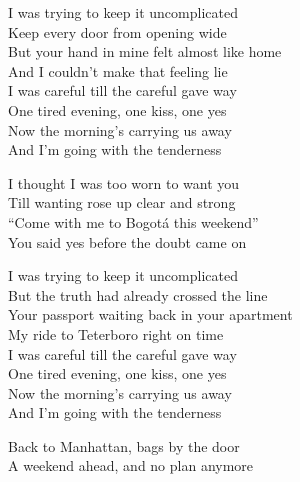 \begin{lyrics}
I was trying to keep it uncomplicated\\
Keep every door from opening wide\\
But your hand in mine felt almost like home\\
And I couldn’t make that feeling lie\\
I was careful till the careful gave way\\
One tired evening, one kiss, one yes\\
Now the morning’s carrying us away\\
And I’m going with the tenderness

I thought I was too worn to want you\\
Till wanting rose up clear and strong\\
“Come with me to Bogotá this weekend”\\
You said yes before the doubt came on

I was trying to keep it uncomplicated\\
But the truth had already crossed the line\\
Your passport waiting back in your apartment\\
My ride to Teterboro right on time\\
I was careful till the careful gave way\\
One tired evening, one kiss, one yes\\
Now the morning’s carrying us away\\
And I’m going with the tenderness

Back to Manhattan, bags by the door\\
A weekend ahead, and no plan anymore
\end{lyrics}

